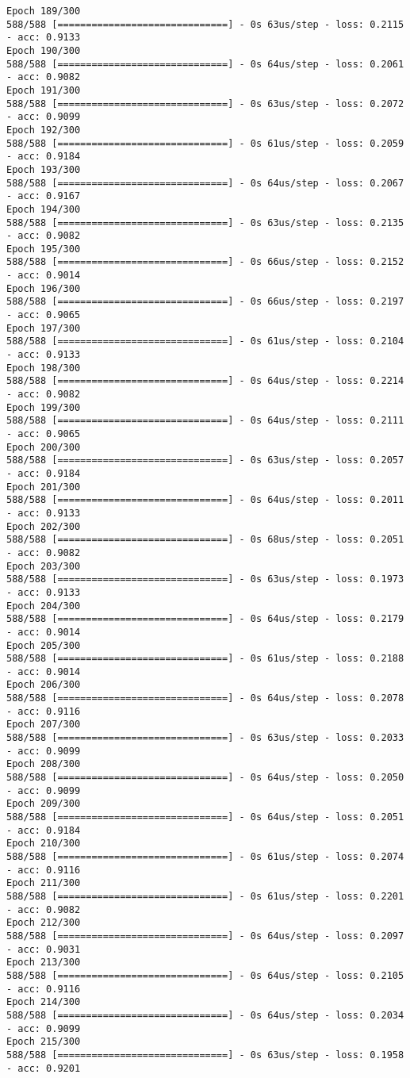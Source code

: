 \documentclass[11pt]{article}
\begin{document}
\begin{Verbatim}[commandchars=\\\{\}]
Epoch 189/300
588/588 [==============================] - 0s 63us/step - loss: 0.2115 - acc: 0.9133
Epoch 190/300
588/588 [==============================] - 0s 64us/step - loss: 0.2061 - acc: 0.9082
Epoch 191/300
588/588 [==============================] - 0s 63us/step - loss: 0.2072 - acc: 0.9099
Epoch 192/300
588/588 [==============================] - 0s 61us/step - loss: 0.2059 - acc: 0.9184
Epoch 193/300
588/588 [==============================] - 0s 64us/step - loss: 0.2067 - acc: 0.9167
Epoch 194/300
588/588 [==============================] - 0s 63us/step - loss: 0.2135 - acc: 0.9082
Epoch 195/300
588/588 [==============================] - 0s 66us/step - loss: 0.2152 - acc: 0.9014
Epoch 196/300
588/588 [==============================] - 0s 66us/step - loss: 0.2197 - acc: 0.9065
Epoch 197/300
588/588 [==============================] - 0s 61us/step - loss: 0.2104 - acc: 0.9133
Epoch 198/300
588/588 [==============================] - 0s 64us/step - loss: 0.2214 - acc: 0.9082
Epoch 199/300
588/588 [==============================] - 0s 64us/step - loss: 0.2111 - acc: 0.9065
Epoch 200/300
588/588 [==============================] - 0s 63us/step - loss: 0.2057 - acc: 0.9184
Epoch 201/300
588/588 [==============================] - 0s 64us/step - loss: 0.2011 - acc: 0.9133
Epoch 202/300
588/588 [==============================] - 0s 68us/step - loss: 0.2051 - acc: 0.9082
Epoch 203/300
588/588 [==============================] - 0s 63us/step - loss: 0.1973 - acc: 0.9133
Epoch 204/300
588/588 [==============================] - 0s 64us/step - loss: 0.2179 - acc: 0.9014
Epoch 205/300
588/588 [==============================] - 0s 61us/step - loss: 0.2188 - acc: 0.9014
Epoch 206/300
588/588 [==============================] - 0s 64us/step - loss: 0.2078 - acc: 0.9116
Epoch 207/300
588/588 [==============================] - 0s 63us/step - loss: 0.2033 - acc: 0.9099
Epoch 208/300
588/588 [==============================] - 0s 64us/step - loss: 0.2050 - acc: 0.9099
Epoch 209/300
588/588 [==============================] - 0s 64us/step - loss: 0.2051 - acc: 0.9184
Epoch 210/300
588/588 [==============================] - 0s 61us/step - loss: 0.2074 - acc: 0.9116
Epoch 211/300
588/588 [==============================] - 0s 61us/step - loss: 0.2201 - acc: 0.9082
Epoch 212/300
588/588 [==============================] - 0s 64us/step - loss: 0.2097 - acc: 0.9031
Epoch 213/300
588/588 [==============================] - 0s 64us/step - loss: 0.2105 - acc: 0.9116
Epoch 214/300
588/588 [==============================] - 0s 64us/step - loss: 0.2034 - acc: 0.9099
Epoch 215/300
588/588 [==============================] - 0s 63us/step - loss: 0.1958 - acc: 0.9201

\end{Verbatim}
\end{document}

